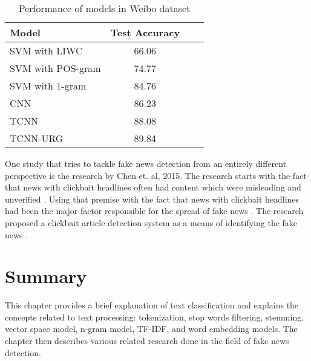 \begin{table}[h]
\begin{center}
\caption{Performance of models in Weibo dataset}
\label{tbl:weibo_performance}
\begin{tabular}{lccc}
\toprule 
\rule[-1pt]{0pt}{14pt}Model&Test Accuracy\\
\midrule 
SVM with LIWC&66.06\\
SVM with POS-gram&74.77\\
SVM with 1-gram&84.76\\
CNN&86.23\\
TCNN&88.08\\
TCNN-URG&89.84\\
\bottomrule
\end{tabular}
\end{center}
\end{table}

One study that tries to tackle fake news detection from an entirely different perspective is the research by Chen et. al, 2015. The research starts with the fact that news with clickbait headlines often had content which were misleading and unverified \cite{silverman2016analysis}. Using that premise with the fact that news with clickbait headlines had been the major factor responsible for the spread of fake news \cite{silverman2015lies}. The research proposed a clickbait article detection system as a means of identifying the fake news \cite{chen2015misleading}.

\section{Summary}
This chapter provides a brief explanation of text classification and explains the concepts related to text processing: tokenization, stop words filtering, stemming, vector space model, n-gram model, TF-IDF, and word embedding models. The chapter then describes various related research done in the field of fake news detection.